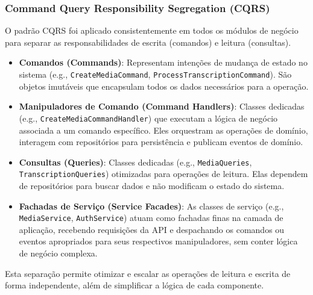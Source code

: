 \subsubsection{Command Query Responsibility Segregation (CQRS)}
O padrão CQRS foi aplicado consistentemente em todos os módulos de negócio para separar as responsabilidades de escrita (comandos) e leitura (consultas).
\begin{itemize}
    \item \textbf{Comandos (Commands)}: Representam intenções de mudança de estado no sistema (e.g., \texttt{CreateMediaCommand}, \texttt{ProcessTranscriptionCommand}). São objetos imutáveis que encapsulam todos os dados necessários para a operação.
    \item \textbf{Manipuladores de Comando (Command Handlers)}: Classes dedicadas (e.g., \texttt{CreateMediaCommandHandler}) que executam a lógica de negócio associada a um comando específico. Eles orquestram as operações de domínio, interagem com repositórios para persistência e publicam eventos de domínio.
    \item \textbf{Consultas (Queries)}: Classes dedicadas (e.g., \texttt{MediaQueries}, \texttt{TranscriptionQueries}) otimizadas para operações de leitura. Elas dependem de repositórios para buscar dados e não modificam o estado do sistema.
    \item \textbf{Fachadas de Serviço (Service Facades)}: As classes de serviço (e.g., \texttt{MediaService}, \texttt{AuthService}) atuam como fachadas finas na camada de aplicação, recebendo requisições da API e despachando os comandos ou eventos apropriados para seus respectivos manipuladores, sem conter lógica de negócio complexa.
\end{itemize}
Esta separação permite otimizar e escalar as operações de leitura e escrita de forma independente, além de simplificar a lógica de cada componente.


